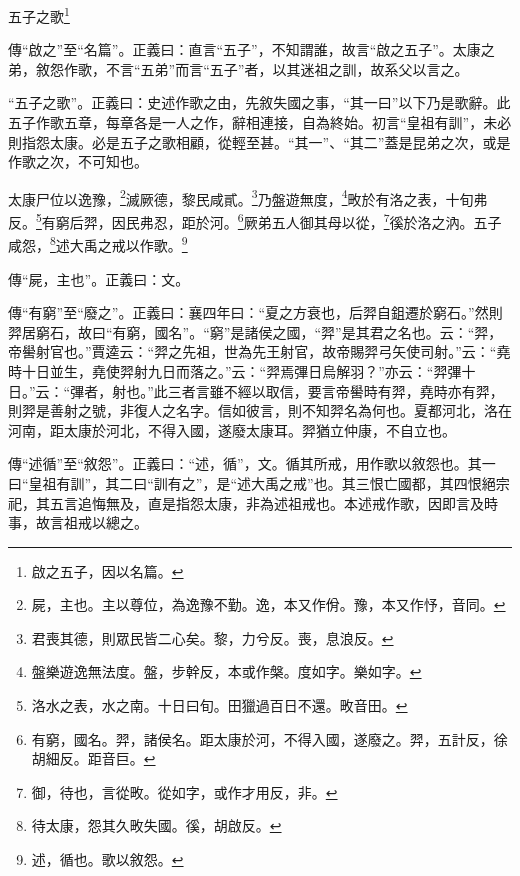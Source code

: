 五子之歌\footnote{啟之五子，因以名篇。}


{\noindent\zhuan{}\fzbyks 傳“啟之”至“名篇”。正義曰：直言“五子”，不知謂誰，故言“啟之五子”。太康之弟，敘怨作歌，不言“五弟”而言“五子”者，以其迷祖之訓，故系父以言之。 \par}

{\noindent\shu{}\fzkt “五子之歌”。正義曰：史述作歌之由，先敘失國之事，“其一曰”以下乃是歌辭。此五子作歌五章，每章各是一人之作，辭相連接，自為終始。初言“皇祖有訓”，未必則指怨太康。必是五子之歌相顧，從輕至甚。“其一”、“其二”蓋是昆弟之次，或是作歌之次，不可知也。 \par}

太康尸位以逸豫，\footnote{屍，主也。主以尊位，為逸豫不勤。逸，本又作佾。豫，本又作忬，音同。}滅厥德，黎民咸貳。\footnote{君喪其德，則眾民皆二心矣。黎，力兮反。喪，息浪反。}乃盤遊無度，\footnote{盤樂遊逸無法度。盤，步幹反，本或作槃。度如字。樂如字。}畋於有洛之表，十旬弗反。\footnote{洛水之表，水之南。十日曰旬。田獵過百日不還。畋音田。}有窮后羿，因民弗忍，距於河。\footnote{有窮，國名。羿，諸侯名。距太康於河，不得入國，遂廢之。羿，五計反，徐胡細反。距音巨。}厥弟五人御其母以從，\footnote{御，待也，言從畋。從如字，或作才用反，非。}徯於洛之汭。五子咸怨，\footnote{待太康，怨其久畋失國。徯，胡啟反。}述大禹之戒以作歌。\footnote{述，循也。歌以敘怨。}

{\noindent\zhuan{}\fzbyks 傳“屍，主也”。正義曰：文。 \par}

{\noindent\zhuan{}\fzbyks 傳“有窮”至“廢之”。正義曰：襄四年曰：“夏之方衰也，后羿自鉏遷於窮石。”然則羿居窮石，故曰“有窮，國名”。“窮”是諸侯之國，“羿”是其君之名也。云：“羿，帝嚳射官也。”賈逵云：“羿之先祖，世為先王射官，故帝賜羿弓矢使司射。”云：“堯時十日並生，堯使羿射九日而落之。”云：“羿焉彃日烏解羽？”亦云：“羿彃十日。”云：“彃者，射也。”此三者言雖不經以取信，要言帝嚳時有羿，堯時亦有羿，則羿是善射之號，非復人之名字。信如彼言，則不知羿名為何也。夏都河北，洛在河南，距太康於河北，不得入國，遂廢太康耳。羿猶立仲康，不自立也。 \par}

{\noindent\zhuan{}\fzbyks 傳“述循”至“敘怨”。正義曰：“述，循”，文。循其所戒，用作歌以敘怨也。其一曰“皇祖有訓”，其二曰“訓有之”，是“述大禹之戒”也。其三恨亡國都，其四恨絕宗祀，其五言追悔無及，直是指怨太康，非為述祖戒也。本述戒作歌，因即言及時事，故言祖戒以總之。 \par}

